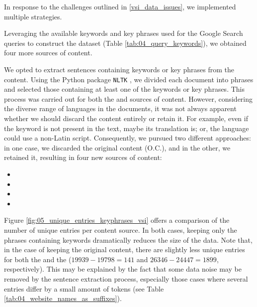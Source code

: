 \label{vsi_preprocessing}

In response to the challenges outlined in \headerName{} \ref{vsi_data_issues}, we implemented multiple strategies.

\label{vsi_leveraging_keywords}

Leveraging the available keywords and key phrases used for the Google Search queries to construct the dataset (Table \ref{tab:04_query_keywords}), we obtained four more sources of content. 


We opted to extract sentences containing keywords or key phrases from the content. Using the Python package \texttt{NLTK} , we divided each document into phrases and selected those containing at least one of the keywords or key phrases. This process was carried out for both the \trafilaturaAbstract{} and \trafilaturaFulltext{} sources of content. However, considering the diverse range of languages in the documents, it was not always apparent whether we should discard the content entirely or retain it. For example, even if the keyword is not present in the text, maybe its translation is; or, the language could use a non-Latin script. Consequently, we pursued two different approaches: in one case, we discarded the original content (O.C.), and in the other, we retained it, resulting in four new sources of content:

\begin{itemize}
    \item \keyphrasesAbstractOnly{}
    \item \keyphrasesAbstractOC{}
    \item \keyphrasesFulltextOnly{}
    \item \keyphrasesFulltextOC{}
\end{itemize}


Figure \ref{fig:05_unique_entries_keyphrases_vsi} offers a comparison of the number of unique entries per content source. In both cases, keeping only the phrases containing keywords dramatically reduces the size of the data. Note that, in the case of keeping the original content, there are slightly less unique entries for both the \trafilaturaAbstract{} and the \trafilaturaFulltext{} ($19939-19798 = 141$ and $26346-24447=1899$, respectively). This may be explained by the fact that some data noise may be removed by the sentence extraction process, especially those cases where several entries differ by a small amount of tokens (see Table \ref{tab:04_website_names_as_suffixes}).

